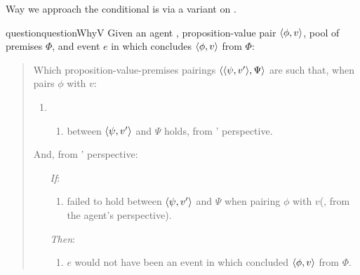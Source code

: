 \begin{note}
  Way we approach the conditional is via a variant on \qWhyVnP{}.
\end{note}

\begin{note}
  \begin{restatable}[\qWhyV{}]{question}{questionWhyV}
    \label{q:why:v}
    Given an agent \vAgent{}, proposition-value pair \(\langle \phi, v \rangle\), pool of premises \(\Phi\), and event \(e\) in which \vAgent{} concludes \(\langle \phi, v \rangle\) from \(\Phi\):

    \begin{quote}
      Which proposition-value-premises pairings \(\langle \langle \psi, v' \rangle, \Psi \rangle\) are such that, when \vAgent{} pairs \(\phi\) with \(v\):

      \begin{enumerate}[label=]
      \item
        \begin{enumerate}[label=\alph*., ref=(\alph*), series=qWhyVDef]
        \item
           between \(\langle \psi, v' \rangle\) and \(\Psi\) holds, from \vAgent{}' perspective.
        \end{enumerate}
      \end{enumerate}

      And, from \vAgent{}' perspective:

      \begin{enumerate}
      \item[\emph{If}:]
        \begin{enumerate}[label=\alph*., ref=(\alph*), resume*=qWhyVDef]
        \item
           failed to hold between \(\langle \psi, v' \rangle\) and \(\Psi\) when pairing \(\phi\) with \(v\)(, from the agent's perspective).
        \end{enumerate}
      \item[\emph{Then}:]
        \begin{enumerate}[label=\alph*., ref=(\alph*), resume*=qWhyVDef]
        \item
          \(e\) would not have been an event in which \vAgent{} concluded \(\langle \phi, v \rangle\) from \(\Phi\).
        \end{enumerate}
      \end{enumerate}
    \end{quote}
    \vspace{-\baselineskip}
  \end{restatable}
\end{note}

